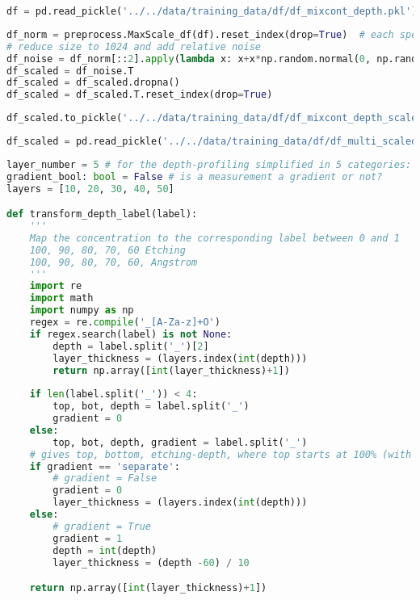 \begin{lstlisting}[language=Python]
df = pd.read_pickle('../../data/training_data/df/df_mixcont_depth.pkl') 
\end{lstlisting}

\begin{lstlisting}[language=Python]
df_norm = preprocess.MaxScale_df(df).reset_index(drop=True)  # each spectrum is scaled to 1
# reduce size to 1024 and add relative noise
df_noise = df_norm[::2].apply(lambda x: x+x*np.random.normal(0, np.random.randint(1,3)*0.01 , len(x)))
df_scaled = df_noise.T
df_scaled = df_scaled.dropna()
df_scaled = df_scaled.T.reset_index(drop=True)
\end{lstlisting}

\begin{lstlisting}[language=Python]
df_scaled.to_pickle('../../data/training_data/df/df_mixcont_depth_scaled.pkl')  # save the normalized, scaled df
\end{lstlisting}

\begin{lstlisting}[language=Python]
df_scaled = pd.read_pickle('../../data/training_data/df/df_multi_scaled.pkl')
\end{lstlisting}

\begin{lstlisting}[language=Python]
layer_number = 5 # for the depth-profiling simplified in 5 categories: 0-10, 10-20, 20-30, 30-40, 40-50 Angstrom
gradient_bool: bool = False # is a measurement a gradient or not?
layers = [10, 20, 30, 40, 50]

def transform_depth_label(label):
    '''
    Map the concentration to the corresponding label between 0 and 1
    100, 90, 80, 70, 60 Etching
    100, 90, 80, 70, 60, Angstrom
    '''
    import re
    import math
    import numpy as np
    regex = re.compile('_[A-Za-z]+O')
    if regex.search(label) is not None:
        depth = label.split('_')[2]
        layer_thickness = (layers.index(int(depth)))
        return np.array([int(layer_thickness)+1])
            
    if len(label.split('_')) < 4:
        top, bot, depth = label.split('_')
        gradient = 0
    else:
        top, bot, depth, gradient = label.split('_')
    # gives top, bottom, etching-depth, where top starts at 100% (with 0 etching) on the top
    if gradient == 'separate':
        # gradient = False
        gradient = 0
        layer_thickness = (layers.index(int(depth)))
    else:
        # gradient = True
        gradient = 1
        depth = int(depth)
        layer_thickness = (depth -60) / 10

    return np.array([int(layer_thickness)+1])
\end{lstlisting}

